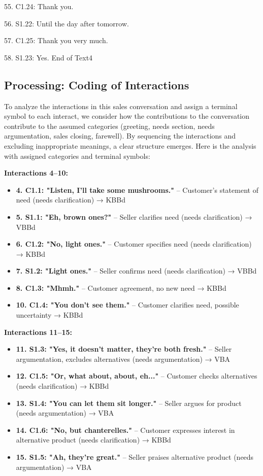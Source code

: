 \documentclass[
]{article}
\begin{document}
55. C1.24: Thank you.

56. S1.22: Until the day after tomorrow.

57. C1.25: Thank you very much.

58. S1.23: Yes. End of Text4

\subsection{Processing: Coding of Interactions}\label{processing-coding-of-interactions}

To analyze the interactions in this sales conversation and assign a terminal symbol to each interact, we consider how the contributions to the conversation contribute to the assumed categories (greeting, needs section, needs argumentation, sales closing, farewell). By sequencing the interactions and excluding inappropriate meanings, a clear structure emerges. Here is the analysis with assigned categories and terminal symbols:

\textbf{Interactions 4--10:}

\begin{itemize}
\item
  \textbf{4. C1.1: "Listen, I'll take some mushrooms."} -- Customer's statement of need (needs clarification) → KBBd
\item
  \textbf{5. S1.1: "Eh, brown ones?"} -- Seller clarifies need (needs clarification) → VBBd
\item
  \textbf{6. C1.2: "No, light ones."} -- Customer specifies need (needs clarification) → KBBd
\item
  \textbf{7. S1.2: "Light ones."} -- Seller confirms need (needs clarification) → VBBd
\item
  \textbf{8. C1.3: "Mhmh."} -- Customer agreement, no new need → KBBd
\item
  \textbf{10. C1.4: "You don't see them."} -- Customer clarifies need, possible uncertainty → KBBd
\end{itemize}

\textbf{Interactions 11--15:}

\begin{itemize}
\item
  \textbf{11. S1.3: "Yes, it doesn't matter, they're both fresh."} -- Seller argumentation, excludes alternatives (needs argumentation) → VBA
\item
  \textbf{12. C1.5: "Or, what about, about, eh..."} -- Customer checks alternatives (needs clarification) → KBBd
\item
  \textbf{13. S1.4: "You can let them sit longer."} -- Seller argues for product (needs argumentation) → VBA
\item
  \textbf{14. C1.6: "No, but chanterelles."} -- Customer expresses interest in alternative product (needs clarification) → KBBd
\item
  \textbf{15. S1.5: "Ah, they're great."} -- Seller praises alternative product (needs argumentation) → VBA
\end{itemize}
\end{document}
